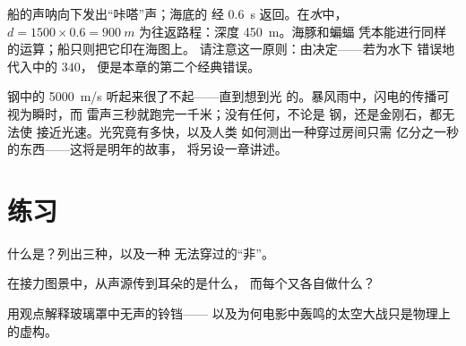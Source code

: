 \begin{example}[认真的声呐计算]\label{ex:g7:sound-production:sonar}
船的声呐向下发出“咔嗒”声；海底的
经 \qty{0.6}{s} 返回。在\emph{水}中，$d = 1500 \times 0.6 =
\qty{900}{m}$ 为往返路程：深度 \qty{450}{m}。海豚和蝙蝠
凭本能进行同样的运算；船只则把它印在海图上。
请注意这一原则：由决定——若为水下
错误地代入中的 $340$，
便是本章的第二个经典错误。
\end{example}

\begin{remark}[“快”仍有局限]\label{rem:g7:sound-production:light}
钢中的 \qty{5000}{m/s} 听起来很了不起——直到想到光
的。暴风雨中，闪电的传播可视为瞬时，而
雷声三秒就跑完一千米；没有任何，不论是
钢，还是金刚石，都无法使
接近光速。光究竟有多快，以及人类
如何测出一种穿过房间只需
亿分之一秒的东西——这将是明年的故事，
将另设一章讲述。
\end{remark}

\section{练习}

\begin{exercise}[$\star$]\label{exo:g7:sound-production:1}
什么是？列出三种，以及一种
无法穿过的“非”。
\end{exercise}

\begin{exercise}[$\star$]\label{exo:g7:sound-production:2}
在接力图景中，从声源传到耳朵的是什么，
而每个又各自做什么？
\end{exercise}

\begin{exercise}[$\star$]\label{exo:g7:sound-production:3}
用观点解释玻璃罩中无声的铃铛——
以及为何电影中轰鸣的太空大战只是物理上的虚构。
\end{exercise}


